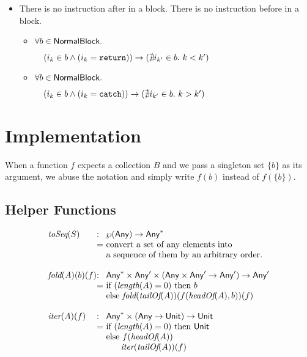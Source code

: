 \begin{itemize}
\item There is no instruction after  in a block. There is no instruction before  in a block.
\begin{itemize}
\item $\forall b \in \mbox{\textsf{NormalBlock}}.$

$\quad(i_k \in b \wedge (i_k = \mbox{\texttt{return}})) \rightarrow (\nexists i_{k'} \in b.\ k < k')$
\item $\forall b \in \mbox{\textsf{NormalBlock}}.$

$\quad(i_k \in b \wedge (i_k = \mbox{\texttt{catch}})) \rightarrow (\nexists i_{k'} \in b.\ k > k')$
\end{itemize}
\end{itemize}

\section{\CFG Implementation}
When a function $f$ expects a collection $B$ and we pass a singleton set $\{b\}$
as its argument, we abuse the notation and simply write $f(b)$ instead of $f(\{b\})$.

\subsection{Helper Functions}
\[
\begin{array}{l@{}l@{~}l}
\toSeq(S) & : & \powerset{\Any} \rightarrow \Any^{*}\\
& = & \text{convert a set of any elements into}\\
& & \text{a sequence of them by an arbitrary order.}\\
& & \\

\fold(A)(b)(f) & : & \Any^{*} \times \Any' \times (\Any \times \Any' \rightarrow \Any') \rightarrow \Any'\\
& = & \mbox{if}\ (\length(A) = 0)\ \mbox{then}\ b \\
& & \mbox{else}\ \fold(\tailOf(A))(f(\headOf(A),b))(f)\\
& & \\

\iter(A)(f) & : & \Any^{*} \times (\Any \rightarrow \Unit) \rightarrow \Unit\\
& = & \mbox{if}\ (\length(A) = 0)\ \mbox{then}\ \Unit \\
& & \mbox{else}\ f(\headOf(A))\\
& & \phantom{else} \iter(\tailOf(A))(f)\\
\end{array}
\]

